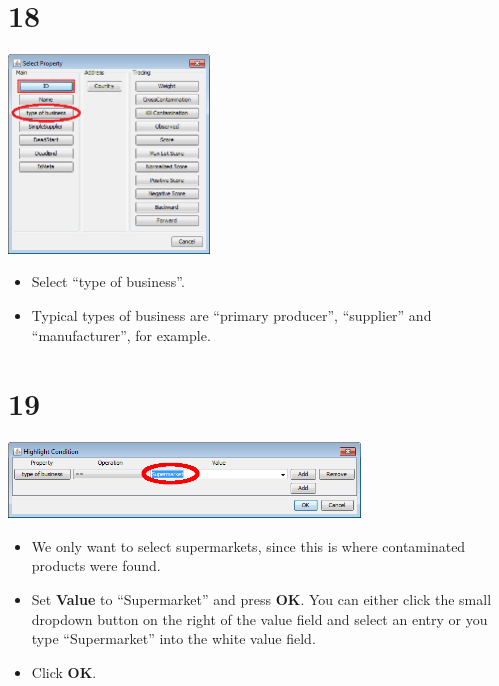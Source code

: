 \documentclass[10pt]{beamer}
\begin{document}
\section{18}
\begin{frame}
	\begin{center}
  		\includegraphics[width=0.4\textwidth]{18.png}
	\end{center}
	\begin{itemize}
		\item Select ``type of business''.
		\item Typical types of business are ``primary producer'', ``supplier'' and ``manufacturer'', for example.
	\end{itemize}
\end{frame}

\section{19}
\begin{frame}
	\begin{center}
  		\includegraphics[width=0.7\textwidth]{19.png}
	\end{center}
	\begin{itemize}
		\item We only want to select supermarkets, since this is where contaminated products were found.
		\item Set \textbf{Value} to ``Supermarket'' and press \textbf{OK}. You can either click the small dropdown button on the right of the value field and select an entry or you type ``Supermarket'' into the white value field.
		\item Click \textbf{OK}.
	\end{itemize}
\end{frame}
\end{document}
